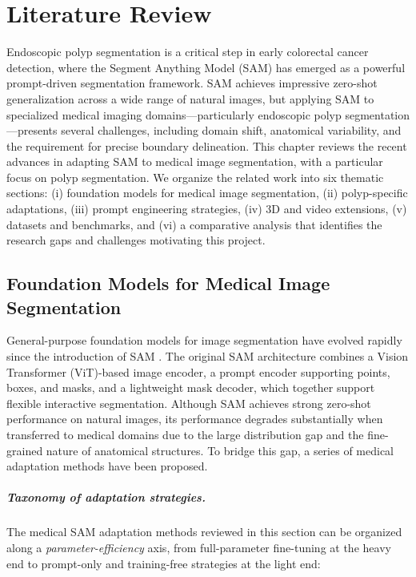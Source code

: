\chapter{Literature Review}

Endoscopic polyp segmentation is a critical step in early colorectal cancer detection, where the Segment Anything Model (SAM) \cite{kirillov2023sam} has emerged as a powerful prompt-driven segmentation framework. SAM achieves impressive zero-shot generalization across a wide range of natural images, but applying SAM to specialized medical imaging domains---particularly endoscopic polyp segmentation---presents several challenges, including domain shift, anatomical variability, and the requirement for precise boundary delineation. This chapter reviews the recent advances in adapting SAM to medical image segmentation, with a particular focus on polyp segmentation. We organize the related work into six thematic sections: (i) foundation models for medical image segmentation, (ii) polyp-specific adaptations, (iii) prompt engineering strategies, (iv) 3D and video extensions, (v) datasets and benchmarks, and (vi) a comparative analysis that identifies the research gaps and challenges motivating this project.

\section{Foundation Models for Medical Image Segmentation}

General-purpose foundation models for image segmentation have evolved rapidly since the introduction of SAM \cite{kirillov2023sam}. The original SAM architecture combines a Vision Transformer (ViT)-based image encoder, a prompt encoder supporting points, boxes, and masks, and a lightweight mask decoder, which together support flexible interactive segmentation. Although SAM achieves strong zero-shot performance on natural images, its performance degrades substantially when transferred to medical domains due to the large distribution gap and the fine-grained nature of anatomical structures. To bridge this gap, a series of medical adaptation methods have been proposed.

\paragraph{Taxonomy of adaptation strategies.}
The medical SAM adaptation methods reviewed in this section can be organized along a \emph{parameter-efficiency} axis, from full-parameter fine-tuning at the heavy end to prompt-only and training-free strategies at the light end:

